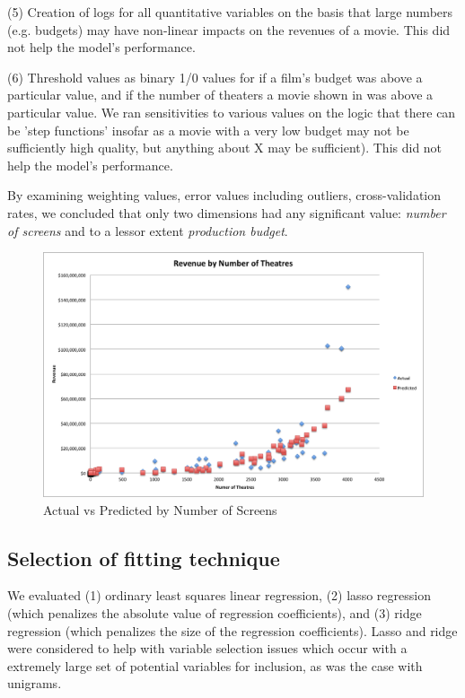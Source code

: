 \documentclass[11pt, oneside]{article}   	%
\begin{document}
(5) Creation of logs for all quantitative variables on the basis that large numbers (e.g. budgets) may have non-linear impacts on the revenues of a movie. This did not help the model's performance.

(6) Threshold values as binary 1/0 values for if a film's budget was above a particular value, and if the number of theaters a movie shown in was above a particular value. We ran sensitivities to various values on the logic that there can be 'step functions' insofar as a movie with a very low budget may not be sufficiently high quality, but anything about X may be sufficient). This did not help the model's performance.

By examining weighting values, error values including outliers, cross-validation rates, we concluded that only two dimensions had any significant value: \emph{number of screens} and to a lessor extent \emph{production budget}.


\begin{figure}[h!] 
\centering
\includegraphics[scale=0.55]{numberOfTheatres}
\caption{Actual vs Predicted by Number of Screens}
\end{figure}


\subsection*{Selection of fitting technique}

We evaluated (1) ordinary least squares linear regression, (2) lasso regression (which penalizes the absolute value of regression coefficients), and (3) ridge regression (which penalizes the size of the regression coefficients). Lasso and ridge were considered to help with variable selection issues which occur with a extremely large set of potential variables for inclusion, as was the case with unigrams.
\end{document}
